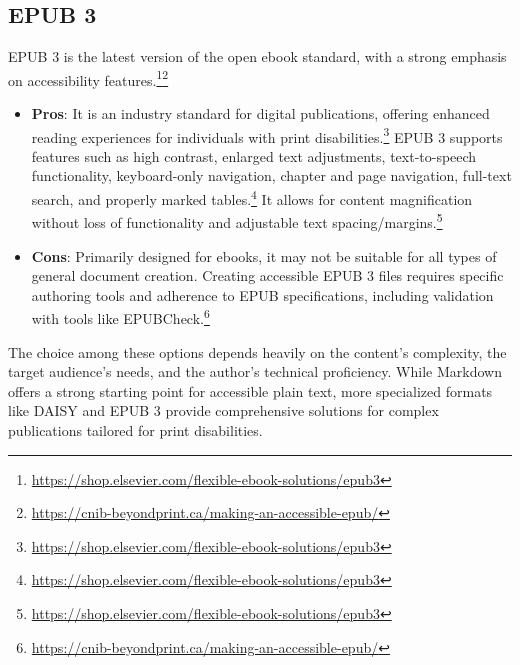\subsection{EPUB 3}
EPUB 3 is the latest version of the open ebook standard, with a strong emphasis on accessibility features.\footnote{\url{https://shop.elsevier.com/flexible-ebook-solutions/epub3}}\footnote{\url{https://cnib-beyondprint.ca/making-an-accessible-epub/}}
\begin{itemize}[noitemsep,topsep=0pt]
    \item \textbf{Pros}: It is an industry standard for digital publications, offering enhanced reading experiences for individuals with print disabilities.\footnote{\url{https://shop.elsevier.com/flexible-ebook-solutions/epub3}} EPUB 3 supports features such as high contrast, enlarged text adjustments, text-to-speech functionality, keyboard-only navigation, chapter and page navigation, full-text search, and properly marked tables.\footnote{\url{https://shop.elsevier.com/flexible-ebook-solutions/epub3}} It allows for content magnification without loss of functionality and adjustable text spacing/margins.\footnote{\url{https://shop.elsevier.com/flexible-ebook-solutions/epub3}}
    \item \textbf{Cons}: Primarily designed for ebooks, it may not be suitable for all types of general document creation. Creating accessible EPUB 3 files requires specific authoring tools and adherence to EPUB specifications, including validation with tools like EPUBCheck.\footnote{\url{https://cnib-beyondprint.ca/making-an-accessible-epub/}}
\end{itemize}
The choice among these options depends heavily on the content's complexity, the target audience's needs, and the author's technical proficiency. While Markdown offers a strong starting point for accessible plain text, more specialized formats like DAISY and EPUB 3 provide comprehensive solutions for complex publications tailored for print disabilities.

